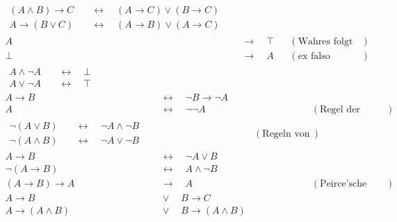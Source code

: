 \begin{align*}
    \begin{split}
        (A\land B) \to C & \quad\leftrightarrow\quad (A\to C) \lor (B\to C) \\ %
        A \to (B\lor C) & \quad\leftrightarrow\quad (A\to B) \lor (A\to C) %
    \end{split} \\[1em]
    A & \quad\to\quad \top && (\text{Wahres folgt aus Beliebigem}) \\
    \bot & \quad\to\quad A && (\text{ex falso quodlibet}) \\[1em]
    \begin{split}
        A \land \neg A & \quad\leftrightarrow\quad \bot \\
        A \lor \neg A & \quad\leftrightarrow\quad \top
    \end{split}
\end{align*}
\begin{align*}
    A \to B & \quad \leftrightarrow\quad \neg B \to \neg A \\
    A & \quad\leftrightarrow\quad \neg\neg A && (\text{Regel der doppelten Verneinung}) \\[1em]
    \begin{split}
        \neg (A \lor B) & \quad\leftrightarrow\quad \neg A \land \neg B\\
        \neg(A \land B) & \quad\leftrightarrow\quad \neg A \lor \neg B  %
    \end{split} && (\text{Regeln von De Morgan}) \\[1em]
    A\to B & \quad\leftrightarrow\quad  \neg A \lor B \\
    \neg (A\to B) & \quad\leftrightarrow\quad  A \land \neg B \\[1em]
    (A\to B)\to A &\quad \to\quad A && (\text{Peirce’sche Regel}) \\
    A\to B & \quad \lor\quad B\to C \\
    A \to(A\land B) &\quad \lor\quad B\to (A\land B)
\end{align*}
\endgroup

 
 
 
 
